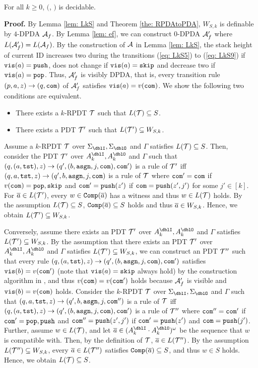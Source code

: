 \begin{theorem}
For all $k\geq 0$, \Real $($\DRPDAv, \RPDTk$)$ is decidable.
\end{theorem}
{\bf Proof.}\quad
By Lemma \ref{lem: LkS} and Theorem \ref{the: RPDAtoPDA},
$W_{S,k}$ is definable by $4$-DPDA ${\cal A}_f$.
By Lemma \ref{lem: ef}, we can construct $0$-DPDA ${\cal A}'_f$
where $L({\cal A}_f')=L({\cal A}_f)$.
By the construction of ${\cal A}$ in Lemma \ref{lem: LkS},
the stack height of current ID increases two during the transitions
(\ref{eq: LkS5}) to (\ref{eq: LkS9}) if $\mathtt{vis}(a)=\mathtt{push}$,
does not change if $\mathtt{vis}(a)=\mathtt{skip}$ and
decrease two if $\mathtt{vis}(a)=\mathtt{pop}$.
Thus, ${\cal A}'_f$ is visibly DPDA, that is,
every transition rule $(p,a,z)\to(q,\mathtt{com})$ of ${\cal A}'_f$
satisfies $\mathtt{vis}(a)=v(\mathtt{com})$.
We show the following two conditions are equivalent.
\begin{itemize}
\item There exists a $k$-RPDT ${\cal T}$ such that $L({\cal T})\subseteq S$.
\item There exists a PDT ${\cal T}'$ such that $L({\cal T}')\subseteq W_{S,k}$.
\end{itemize}
Assume a $k$-RPDT ${\cal T}$ over $\Sigma_\dblI,\Sigma_\dblO$ and $\Gamma$ satisfies $L({\cal T})\subseteq S$.
Then, consider the PDT ${\cal T}'$ over $A_k^\dblI,A_k^\dblO$ and $\Gamma$ such that
$(q,(a,\mathtt{tst}),z)\to(q',(b,\mathtt{asgn},j,\mathtt{com}),\mathtt{com}')$ is a rule of ${\cal T}'$
iff $(q,a,\mathtt{tst},z)\to(q',b,\mathtt{asgn},j,\mathtt{com})$ is a rule of ${\cal T}$ where $\mathtt{com}'=\mathtt{com}$ if $v(\mathtt{com})=\mathtt{pop},\mathtt{skip}$ and $\mathtt{com}'=\mathtt{push}(z')$ if $\mathtt{com}=\mathtt{push}(z',j')$ for some $j'\in[k]$.
For ${\overline{a}}\in L({\cal T}')$, every $w\in{\mathtt{Comp}}({\overline{a}})$
has a witness and thus $w\in L({\cal T})$ holds.
By the assumption $L({\cal T})\subseteq S$,
${\mathtt{Comp}}({\overline{a}})\subseteq S$ holds and thus ${\overline{a}}\in W_{S,k}$.
Hence, we obtain $L({\cal T}')\subseteq W_{S,k}$.

Conversely, assume there exists an PDT ${\cal T}'$ over $A_k^\dblI,A_k^\dblO$ and $\Gamma$
satisfies $L({\cal T}')\subseteq W_{S,k}$.
By the assumption that there exists an PDT ${\cal T}'$ over $A_k^\dblI,A_k^\dblO$ and $\Gamma$
satisfies $L({\cal T}')\subseteq W_{S,k}$,
we can construct an PDT ${\cal T}''$ such that
every rule $(q,(a,\mathtt{tst}),z)\to(q',(b,\mathtt{asgn},j,\mathtt{com}),\mathtt{com}')$
satisfies $\mathtt{vis}(b)=v(\mathtt{com}')$
(note that $\mathtt{vis}(a)=\mathtt{skip}$ always hold)
by the construction algorithm in \cite{Wa96},
and thus $v(\mathtt{com})=v(\mathtt{com}')$ holds because ${\cal A}'_f$ is visible and $\mathtt{vis}(b)=v(\mathtt{com})$ holds.
Consider the $k$-RPDT ${\cal T}$ over $\Sigma_\dblI,\Sigma_\dblO$ and $\Gamma$
such that
$(q,a,\mathtt{tst},z)\to(q',b,\mathtt{asgn},j,\mathtt{com}'')$ is a rule of ${\cal T}$
iff $(q,(a,\mathtt{tst}),z)\to(q',(b,\mathtt{asgn},j,\mathtt{com}),\mathtt{com}')$ is a rule of ${\cal T}''$
where $\mathtt{com}''=\mathtt{com}'$ if $\mathtt{com}'=\mathtt{pop},\mathtt{push}$ and
$\mathtt{com}''=\mathtt{push}(z',j')$ if $\mathtt{com}'=\mathtt{push}(z')$ and $\mathtt{com}=\mathtt{push}(j')$.
Further, assume $w\in L({\cal T})$, and let
$\overa\in (A_k^\dblI\cdot A_k^\dblO)^\omega$
be the sequence that $w$ is compatible with.
Then, by the definition of ${\cal T}$,
${\overline{a}}\in L({\cal T}'')$.
By the assumption $L({\cal T}'')\subseteq W_{S,k}$,
every ${\overline{a}}\in L({\cal T}'')$
satisfies ${\mathtt{Comp}}({\overline{a}})\subseteq S$, and thus $w\in S$ holds.
Hence, we obtain $L({\cal T})\subseteq S$.

